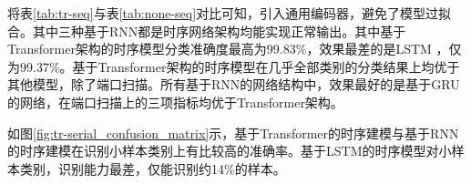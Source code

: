
将表\ref{tab:tr-seq}与表\ref{tab:none-seq}对比可知，引入通用编码器，避免了模型过拟合。其中三种基于RNN都是时序网络架构均能实现正常输出。其中基于Transformer架构的时序模型分类准确度最高为99.83\%，效果最差的是LSTM
，仅为99.37\%。基于Transformer架构的时序模型在几乎全部类别的分类结果上均优于其他模型，除了端口扫描。所有基于RNN的网络结构中，效果最好的是基于GRU的网络，在端口扫描上的三项指标均优于Transformer架构。

如图\ref{fig:tr-serial_confusion_matrix}示，基于Transformer的时序建模与基于RNN的时序建模在识别小样本类别上有比较高的准确率。基于LSTM的时序模型对小样本类别，识别能力最差，仅能识别约14\%的样本。

\begin{figure}[htbp] %
\centering %

\end{figure}
